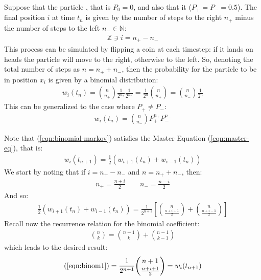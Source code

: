\documentclass[../template.tex]{subfiles}
\begin{document}
Suppose that the particle , that is $P_0 = 0$, and also that it  ($P_+ = P_- = 0.5$). The final position $i$ at time $t_n$ is given by the number of steps to the right $n_+$ minus the number of steps to the left $n_- \in \mathbb{N}$:
\begin{align*}
    \mathbb{Z} \ni i = n_+ - n_-
\end{align*}
This process can be simulated by flipping a coin at each timestep: if it lands on heads the particle will move to the right, otherwise to the left. So, denoting the total number of steps as $n = n_+ + n_-$, then the probability for the particle to be in position $x_i$ is 
given by a binomial distribution:  
\begin{align}
    w_i(t_n) =  {{n}\choose{n_+}} \frac{1}{2^{n_+}} \frac{1}{2^{n_-}} = \frac{1}{2^n} {{n}\choose{n_+}} = {n\choose n_-} \frac{1}{2^n}
    \label{eqn:binomial-markov}
\end{align}
This can be generalized to the case where $P_+ \neq P_-$:
\begin{align}
    w_i(t_n) = {n\choose n_-} P_+^{n_+} P_-^{n_-}
    \label{eqn:witn}
\end{align}

\begin{expl}
    Note that (\ref{eqn:binomial-markov}) satisfies the Master Equation (\ref{eqn:master-eq}), that is:
    \begin{align*}
        w_i(t_{n+1}) = \frac{1}{2}(w_{i+1}(t_n) + w_{i-1}(t_n)) 
    \end{align*}
    We start by noting that if $i = n_+ - n_-$ and $n= n_+ + n_-$, then:
    \begin{align*}
        n_+ = \frac{n+i}{2} \qquad n_- = \frac{n-i}{2}  
    \end{align*}  
    And so:
    \begin{align}
        \frac{1}{2}(w_{i+1}(t_n) + w_{i-1}(t_n)) = \frac{1}{2^{n+1}} \left[{n\choose \frac{n+i+1}{2}} + {n \choose \frac{n+i-1}{2} }\right]
        \label{eqn:binom1} 
    \end{align}
    Recall now the recurrence relation for the binomial coefficient:
    \begin{align*}
        {n\choose k} = {n-1 \choose k} + {n-1 \choose k-1}
    \end{align*}
    which leads to the desired result:
    \begin{align*}
        (\ref{eqn:binom1}) = \frac{1}{2^{n+1}} {n+1 \choose \frac{n+i+1}{2} } = w_{i}(t_{n+1})
    \end{align*}
\end{expl}
\end{document}
